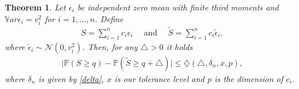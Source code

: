 \documentclass[12pt]{article}
\renewcommand{\=}[1]{\stackrel{#1}{=}} %
\providecommand{\e}{\epsilon}
\newtheorem{thm}{Theorem}[section]
\begin{document}
\par {\color{blue}{if we construct such function, then the the theorem will look like something like this:}}
\begin{thm}
Let $\e_i$ be independent zero mean with finite third moments and $\mathbb{V}ar \e_i = v_i^2$ for $i = 1, \dots, n$. Define 
\begin{align}
S = \sum_{i=1}^n c_i \e_i \quad \text{ and } \quad \tilde{S} = \sum_{i=1}^n c_i \tilde{\e}_i,
\end{align}
where $\tilde{\e}_i \sim \mathcal{N}(0, v_i^2)$. Then, for any $\triangle > 0$ it holds 
\begin{align}
\Big|\mathbb{P}(S \ge q) - \mathbb{P}(\tilde{S} \ge q + \triangle) \Big| \le \diamondsuit(\triangle, \delta_n,x, p),
\end{align}
where $\delta_n$ is given by \eqref{delta}, $x$ is our tolerance level and $p$ is the dimension of $c_i$.
\end{thm}
\end{document}
